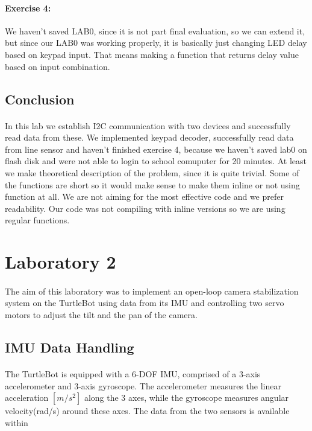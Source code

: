 \documentclass[english]{article}
\begin{document}
		\paragraph{Exercise 4:}
		We haven't saved LAB0, since it is not part final evaluation, so we can extend it, but since our LAB0 was working properly, it
		is basically just changing LED delay based on keypad input. That means making a function that returns delay value based on input combination.

	\subsection{Conclusion}
	\paragraph{}
	In this lab we establish I2C communication with two devices and successfully read data from these. We implemented keypad decoder, 
	successfully read data from line sensor and haven't finished exercise 4, because we haven't saved lab0 on flash disk and were not able
	to login to school comuputer for 20 minutes. At least we make theoretical description of the problem, since it is quite trivial. Some
	of the functions are short so it would make sense to make them inline or not using function at all. We are not aiming for the most effective 
	code and we prefer readability. Our code was not compiling with inline versions so we are using regular functions.

\section{Laboratory 2}
\paragraph{}
The aim of this laboratory was to implement an open-loop camera stabilization system on the TurtleBot using data from its IMU and controlling two servo motors to adjust the tilt and the pan of the camera. 

    \subsection{IMU Data Handling}
    \paragraph{}
    The TurtleBot is equipped with a 6-DOF IMU, comprised of a 3-axis accelerometer and 3-axis gyroscope. The accelerometer measures the linear acceleration $ [m/{s}^2] $ along the 3 axes, while the gyroscope measures angular velocity(rad/s) around these axes. The data from the two sensors is available within
    
\end{document}
